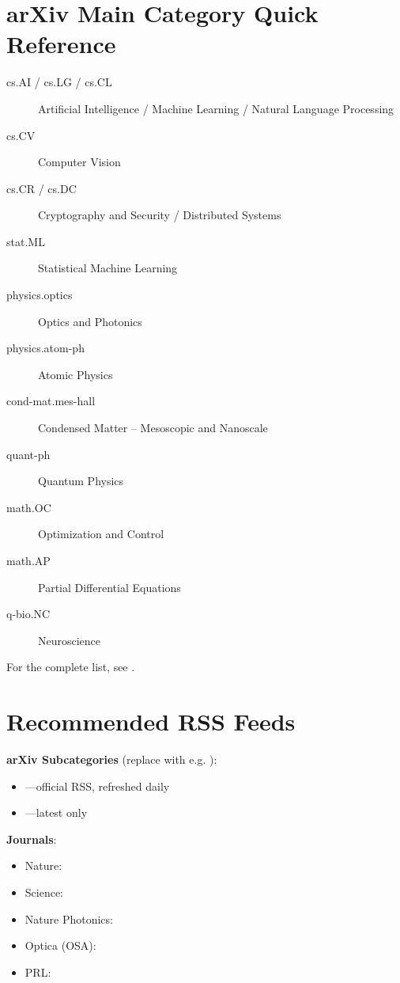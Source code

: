 \chapter{arXiv Main Category Quick Reference}
\label{appx:arxiv}

\begin{description}
  \item[cs.AI / cs.LG / cs.CL] Artificial Intelligence / Machine Learning / Natural
    Language Processing
  \item[cs.CV] Computer Vision
  \item[cs.CR / cs.DC] Cryptography and Security / Distributed Systems
  \item[stat.ML] Statistical Machine Learning
  \item[physics.optics] Optics and Photonics
  \item[physics.atom-ph] Atomic Physics
  \item[cond-mat.mes-hall] Condensed Matter -- Mesoscopic and Nanoscale
  \item[quant-ph] Quantum Physics
  \item[math.OC] Optimization and Control
  \item[math.AP] Partial Differential Equations
  \item[q-bio.NC] Neuroscience
\end{description}

For the complete list, see .

\chapter{Recommended RSS Feeds}
\label{appx:rss}

\textbf{arXiv Subcategories} (replace  with e.g. ):

\begin{itemize}
  \item {}---official RSS, refreshed daily
  \item {}---latest only
\end{itemize}

\textbf{Journals}:

\begin{itemize}
  \item Nature: 
  \item Science: 
  \item Nature Photonics: 
  \item Optica (OSA): 
  \item PRL: 
\end{itemize}

